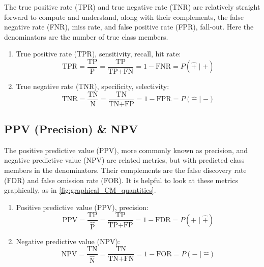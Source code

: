 The true positive rate (TPR) and true negative rate (TNR) are
relatively straight forward to compute and understand, along with their complements,
the false negative rate (FNR), \ie miss rate, and false positive rate (FPR), \ie fall-out.
Here the denominators are the number of true class members.

\begin{enumerate}[noitemsep]
\item True positive rate (TPR), \ie sensitivity, recall, hit rate:
\begin{equation} \label{eq:TPR}
\text{TPR} = \frac{\text{TP}}{\text{P}} = \frac{\text{TP}}{\text{TP}+\text{FN}} = 1 - \text{FNR} = P\left(\hat{+} \mid + \right)
\end{equation}

\item True negative rate (TNR), \ie specificity, selectivity:
\begin{equation} \label{eq:TNR}
\text{TNR} = \frac{\text{TN}}{\text{N}} = \frac{\text{TN}}{\text{TN}+\text{FP}} = 1 - \text{FPR} = P\left(\hat{-} \mid - \right)
\end{equation}
\end{enumerate}

\subsection{PPV (Precision) \& NPV}
\label{ml:general:eval:PPV_NPV}

The positive predictive value (PPV), more commonly known as precision, and negative predictive value (NPV)
are related metrics, but with predicted class members in the denominators.
Their complements are the false discovery rate (FDR) and false omission rate (FOR).
It is helpful to look at these metrics graphically, as in \cref{fig:graphical_CM_quantities}.

\begin{enumerate}[noitemsep]
\item Positive predictive value (PPV), \ie precision:
\begin{equation} \label{eq:PPV}
\text{PPV} = \frac{\text{TP}}{\hat{\text{P}}} = \frac{\text{TP}}{\text{TP}+\text{FP}} = 1 - \text{FDR} = P\left(+ \mid \hat{+} \right)
\end{equation}

\item Negative predictive value (NPV):
\begin{equation} \label{eq:NPV}
\text{NPV} = \frac{\text{TN}}{\hat{\text{N}}} = \frac{\text{TN}}{\text{TN}+\text{FN}} = 1 - \text{FOR} = P\left(- \mid \hat{-} \right)
\end{equation}
\end{enumerate}

